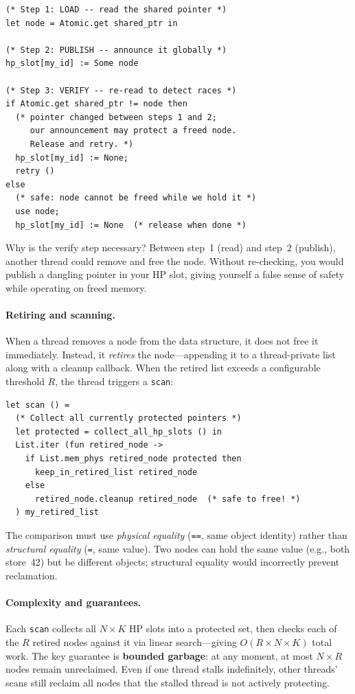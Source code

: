 \documentclass[11pt,a4paper]{article}
\begin{document}
\begin{lstlisting}[caption={HP-protected node access (pseudocode).},
  label={lst:hp}]
(* Step 1: LOAD -- read the shared pointer *)
let node = Atomic.get shared_ptr in

(* Step 2: PUBLISH -- announce it globally *)
hp_slot[my_id] := Some node

(* Step 3: VERIFY -- re-read to detect races *)
if Atomic.get shared_ptr != node then
  (* pointer changed between steps 1 and 2;
     our announcement may protect a freed node.
     Release and retry. *)
  hp_slot[my_id] := None;
  retry ()
else
  (* safe: node cannot be freed while we hold it *)
  use node;
  hp_slot[my_id] := None  (* release when done *)
\end{lstlisting}

Why is the verify step necessary?  Between step~1 (read) and step~2
(publish), another thread could remove and free the node.  Without
re-checking, you would publish a dangling pointer in your HP slot, giving
yourself a false sense of safety while operating on freed memory.

\paragraph{Retiring and scanning.}
When a thread removes a node from the data structure, it does not free it
immediately.  Instead, it \emph{retires} the node---appending it to a
thread-private list along with a cleanup callback.  When the retired list
exceeds a configurable threshold $R$, the thread triggers a \texttt{scan}:

\begin{lstlisting}[caption={HP scan (pseudocode).},label={lst:hpscan}]
let scan () =
  (* Collect all currently protected pointers *)
  let protected = collect_all_hp_slots () in
  List.iter (fun retired_node ->
    if List.mem_phys retired_node protected then
      keep_in_retired_list retired_node
    else
      retired_node.cleanup retired_node  (* safe to free! *)
  ) my_retired_list
\end{lstlisting}

The comparison must use \emph{physical equality} (\texttt{==}, same
object identity) rather than \emph{structural equality} (\texttt{=}, same
value).  Two nodes can hold the same value (e.g., both store~42) but be
different objects; structural equality would incorrectly prevent reclamation.

\paragraph{Complexity and guarantees.}
Each \texttt{scan} collects all $N \times K$ HP slots into a protected set,
then checks each of the $R$ retired nodes against it via linear
search---giving $O(R \times N \times K)$ total work.  The key guarantee is
\textbf{bounded garbage}: at any moment, at most $N \times R$ nodes remain
unreclaimed.  Even if one thread stalls indefinitely, other threads' scans
still reclaim all nodes that the stalled thread is not actively protecting.
\end{document}
